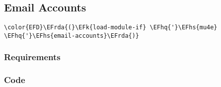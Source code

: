\documentclass[a4wide,10pt]{article}
\newcommand{\EFk}[1]{\textcolor{EFk}{#1}} %
\newcommand{\EFhq}[1]{\textcolor{EFhq}{#1}} %
\newcommand{\EFhs}[1]{\textcolor{EFhs}{#1}} %
\newcommand{\EFrda}[1]{\textcolor{EFrda}{#1}} %
\begin{document}
\subsection{Email Accounts}
\label{sec:org664d186}
\begin{Code}
\begin{Verbatim}
\color{EFD}\EFrda{(}\EFk{load-module-if} \EFhq{'}\EFhs{mu4e} \EFhq{'}\EFhs{email-accounts}\EFrda{)}
\end{Verbatim}
\end{Code}
\subsubsection{Requirements}
\label{sec:orge096980}
\subsubsection{Code}
\label{sec:org1d66a4a}
\end{document}
